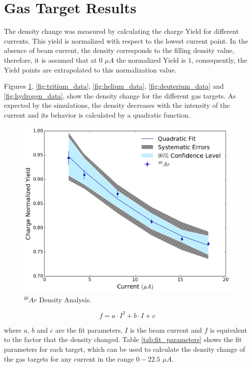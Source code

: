 \documentclass[final,5p,times,twocolumn]{elsarticle}
\begin{document}
 
\section{Gas Target Results}

The density change was measured by calculating the charge Yield for different currents. This yield is normalized with respect to the lowest current point. In the absence of beam current, the density corresponds to the filling density value, therefore, it is assumed that at $0$ $\mu A$ the normalized Yield is $1$, consequently, the Yield points are extrapolated to this normalization value. 

Figures  \ref{fig:argon_data}, \ref{fig:tritium_data}, \ref{fig:helium_data}, \ref{fig:deuterium_data} and \ref{fig:hydrogen_data},  show the density  change for the different gas targets. As expected by the simulations, the density decreases with the intensity of the current and its behavior is calculated by a quadratic function. 


\begin{figure}[!h]
 \centering
 \includegraphics[width=\linewidth]{images/argon_data.pdf}
  \caption{$^{40}Ar$ Density Analysis.}
  \label{fig:argon_data}
\end{figure}


\begin{equation}
f = a\cdot I^{2} + b \cdot {I} + c
\label{eq:boiling_factor}
\end{equation}

\noindent where $a$, $b$ and $c$ are the fit parameters, $I$ is the beam current and $f$ is equivalent to the factor that the density changed. Table \ref{tab:fit_parameters} shows the fit parameters for each target, which can be used to calculate the density change of the gas targets for any current in the range $0-22.5$ $\mu A$. 
\end{document}
